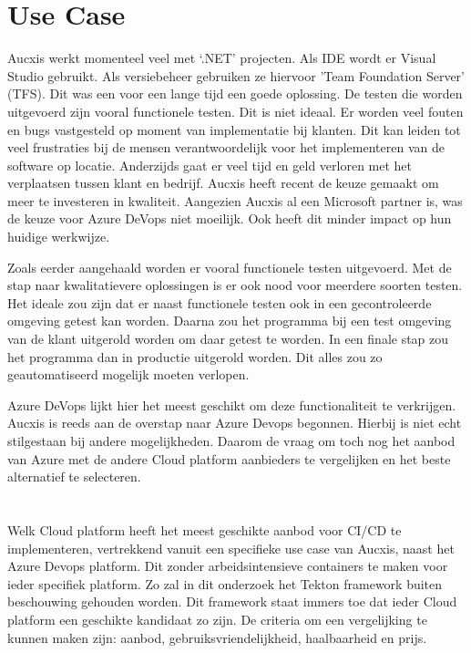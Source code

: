 \section{Use Case}
\label{sec:usecase}
Aucxis werkt momenteel veel met ‘.NET’ projecten. Als IDE wordt er Visual Studio gebruikt. Als versiebeheer gebruiken ze hiervoor 'Team Foundation Server' (TFS). Dit was een voor een lange tijd een goede oplossing. De testen die worden uitgevoerd zijn vooral functionele testen. Dit is niet ideaal. Er worden veel fouten en bugs vastgesteld op moment van implementatie bij klanten. Dit kan leiden tot veel frustraties bij de mensen verantwoordelijk voor het implementeren van de software op locatie. Anderzijds gaat er veel tijd en geld verloren met het verplaatsen tussen klant en bedrijf. Aucxis heeft recent de keuze gemaakt om meer te investeren in kwaliteit. Aangezien Aucxis al een Microsoft partner is, was de keuze voor Azure DeVops niet moeilijk. Ook heeft dit minder impact op hun huidige werkwijze.

Zoals eerder aangehaald worden er vooral functionele testen uitgevoerd. Met de stap naar kwalitatievere oplossingen is er ook nood voor meerdere soorten testen. Het ideale zou zijn dat er naast functionele testen ook in een gecontroleerde omgeving getest kan worden. Daarna zou het programma bij een test omgeving van de klant uitgerold worden om daar getest te worden. In een finale stap zou het programma dan in productie uitgerold worden. Dit alles zou zo geautomatiseerd mogelijk moeten verlopen.

Azure DeVops lijkt hier het meest geschikt om deze functionaliteit te verkrijgen. Aucxis is reeds aan de overstap naar Azure Devops begonnen. Hierbij is niet echt stilgestaan bij andere mogelijkheden. Daarom de vraag om toch nog het aanbod van Azure met de andere Cloud platform aanbieders te vergelijken en het beste alternatief te selecteren.

\section{}
\label{sec:onderzoeksvraag}
Welk Cloud platform heeft het meest geschikte aanbod voor CI/CD te implementeren, vertrekkend vanuit een specifieke use case van Aucxis, naast het Azure Devops platform. Dit zonder arbeidsintensieve containers te maken voor ieder specifiek platform. Zo zal in dit onderzoek het Tekton framework buiten beschouwing gehouden worden. Dit framework staat immers toe dat ieder Cloud platform een geschikte kandidaat zo zijn. De criteria om een vergelijking te kunnen maken zijn: aanbod, gebruiksvriendelijkheid, haalbaarheid en prijs.

